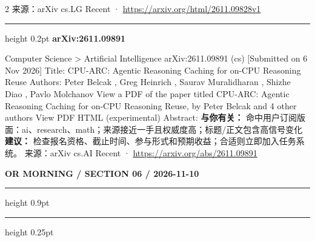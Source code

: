 \documentclass[10.5pt]{ctexart}
\begin{document}
\begin{multicols}{2}
{\footnotesize\color{ormuted} 来源：arXiv cs.LG Recent · \url{https://arxiv.org/html/2611.09828v1}}
\vspace{2mm}
\hrule height 0.2pt
\vspace{2mm}
{\large\bfseries arXiv:2611.09891}\par
Computer Science > Artificial Intelligence arXiv:2611.09891 (cs) [Submitted on 6 Nov 2026] Title: CPU-ARC: Agentic Reasoning Caching for on-CPU Reasoning Reuse Authors: Peter Belcak , Greg Heinrich , Saurav Muralidharan , Shizhe Diao , Pavlo Molchanov View a PDF of the paper titled CPU-ARC: Agentic Reasoning Caching for on-CPU Reasoning Reuse, by Peter Belcak and 4 other authors View PDF HTML (experimental) Abstract:
\textbf{与你有关：} 命中用户订阅版面：ai、research、math；来源接近一手且权威度高；标题/正文包含高信号变化
\textbf{建议：} 检查报名资格、截止时间、参与形式和预期收益；合适则立即加入任务系统。
{\footnotesize\color{ormuted} 来源：arXiv cs.AI Recent · \url{https://arxiv.org/abs/2611.09891}}
\end{multicols}
\newpage
{\small\bfseries OR MORNING / SECTION 06 / 2026-11-10}
\vspace{2mm}
\hrule height 0.9pt
\vspace{1.5mm}
\hrule height 0.25pt
\vspace{4mm}
\end{document}

